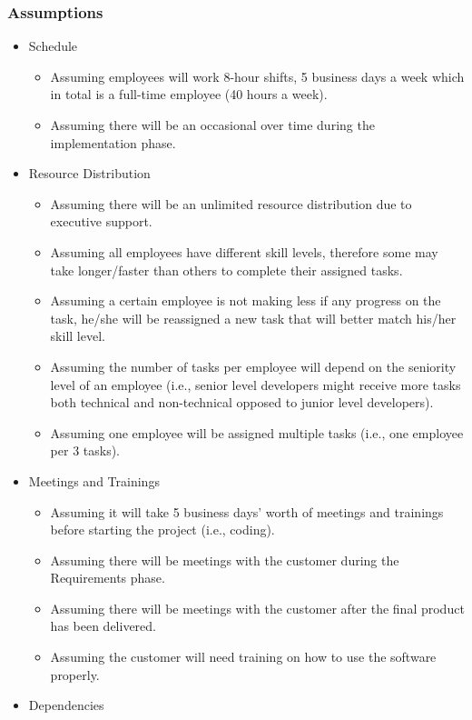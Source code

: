 \documentclass{article}
\begin{document}
\subsubsection{Assumptions}
\begin{itemize}
\item Schedule
  \begin{itemize}
  \item Assuming employees will work 8-hour shifts, 5 business days a week which in total is a full-time employee (40 hours a week).
  \item Assuming there will be an occasional over time during the implementation phase.
  \end{itemize}
\item Resource Distribution
  \begin{itemize}
  \item Assuming there will be an unlimited resource distribution due to executive support.
  \item Assuming all employees have different skill levels, therefore some may take longer/faster than others to complete their assigned tasks.
  \item Assuming a certain employee is not making less if any progress on the task, he/she will be reassigned a new task that will better match his/her skill level.
  \item Assuming the number of tasks per employee will depend on the seniority level of an employee (i.e., senior level developers might receive more tasks both technical and non-technical opposed to junior level developers).
  \item Assuming one employee will be assigned multiple tasks (i.e., one employee per 3 tasks).
  \end{itemize}
\item Meetings and Trainings
  \begin{itemize}
  \item Assuming it will take 5 business days’ worth of meetings and trainings before starting the project (i.e., coding).
  \item Assuming there will be meetings with the customer during the Requirements phase.
  \item Assuming there will be meetings with the customer after the final product has been delivered. 
  \item Assuming the customer will need training on how to use the software properly.
  \end{itemize}
\item Dependencies

\end{itemize}
\end{document}
